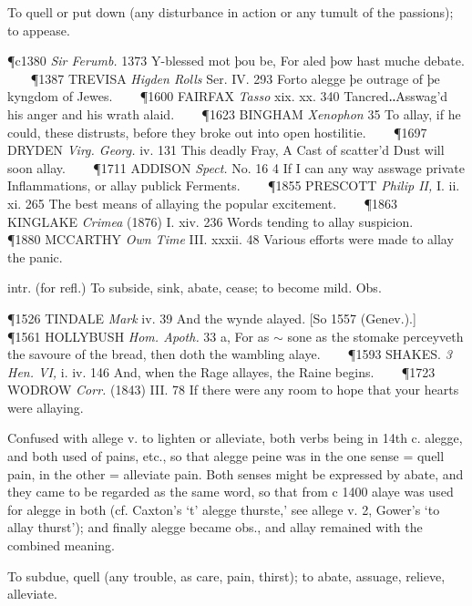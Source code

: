 \begin{description}[wide, labelwidth=!, labelindent=0pt]
\begin{myenumerate}
 To quell or put down (any disturbance in action or any tumult of the passions); to appease. 

\P c1380 \textit{Sir Ferumb.} 1373 Y-blessed mot þou be, For aled þow hast muche debate.    
\P 1387 TREVISA \textit{Higden Rolls} Ser. IV. 293 Forto alegge þe outrage of þe kyngdom of Jewes.    
\P 1600 FAIRFAX \textit{Tasso} xix. xx. 340 Tancred‥Asswag'd his anger and his wrath alaid.    
\P 1623 BINGHAM \textit{Xenophon} 35 To allay, if he could, these distrusts, before they broke out into open hostilitie.    
\P 1697 DRYDEN \textit{Virg. Georg.} iv. 131 This deadly Fray, A Cast of scatter'd Dust will soon allay.    
\P 1711 ADDISON \textit{Spect.} No. 16 4 If I can any way asswage private Inflammations, or allay publick Ferments.    
\P 1855 PRESCOTT \textit{Philip II,} I. ii. xi. 265 The best means of allaying the popular excitement.    
\P 1863 KINGLAKE \textit{Crimea} (1876) I. xiv. 236 Words tending to allay suspicion.    
\P 1880 MCCARTHY \textit{Own Time} III. xxxii. 48 Various efforts were made to allay the panic.

 intr. (for refl.) To subside, sink, abate, cease; to become mild. Obs. 

\P 1526 TINDALE \textit{Mark} iv. 39 And the wynde alayed. [So 1557 (Genev.).]    
\P 1561 HOLLYBUSH \textit{Hom. Apoth.} 33 a, For as $\sim$ sone as the stomake perceyveth the savoure of the bread, then doth the wambling alaye.    
\P 1593 SHAKES. \textit{3 Hen. VI,} i. iv. 146 And, when the Rage allayes, the Raine begins.    
\P 1723 WODROW \textit{Corr.} (1843) III. 78 If there were any room to hope that your hearts were allaying.

 Confused with allege v. to lighten or alleviate, both verbs being in 14th c. alegge, and both used of pains, etc., so that alegge peine was in the one sense = quell pain, in the other = alleviate pain. Both senses might be expressed by abate, and they came to be regarded as the same word, so that from c 
1400 alaye was used for alegge in both (cf. Caxton's ‘t’ alegge thurste,' see allege v. 2, Gower's ‘to allay thurst’); and finally alegge became obs., and allay remained with the combined meaning. 

 To subdue, quell (any trouble, as care, pain, thirst); to abate, assuage, relieve, alleviate. 


\end{myenumerate}
\end{description}
